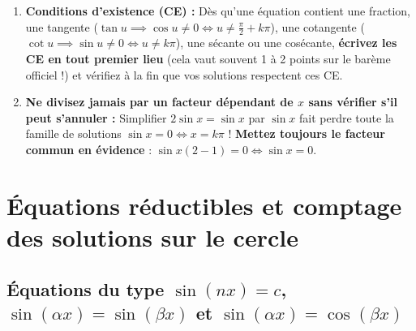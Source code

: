 \begin{attention}
\begin{enumerate}
    \item \textbf{Conditions d'existence (CE) :} Dès qu'une équation contient une fraction, une tangente ($\tan u \implies \cos u \neq 0 \iff u \neq \frac{\pi}{2}+k\pi$), une cotangente ($\cot u \implies \sin u \neq 0 \iff u \neq k\pi$), une sécante ou une cosécante, \textbf{écrivez les CE en tout premier lieu} (cela vaut souvent 1 à 2 points sur le barème officiel !) et vérifiez à la fin que vos solutions respectent ces CE.
    \item \textbf{Ne divisez jamais par un facteur dépendant de $x$ sans vérifier s'il peut s'annuler :} Simplifier $2\sin x = \sin x$ par $\sin x$ fait perdre toute la famille de solutions $\sin x = 0 \iff x = k\pi$ ! \textbf{Mettez toujours le facteur commun en évidence} : $\sin x(2-1) = 0 \iff \sin x = 0$.
\end{enumerate}
\end{attention}

\section{Équations réductibles et comptage des solutions sur le cercle}

\subsection{Équations du type $\sin(nx) = c$, $\sin(\alpha x) = \sin(\beta x)$ et $\sin(\alpha x) = \cos(\beta x)$}

